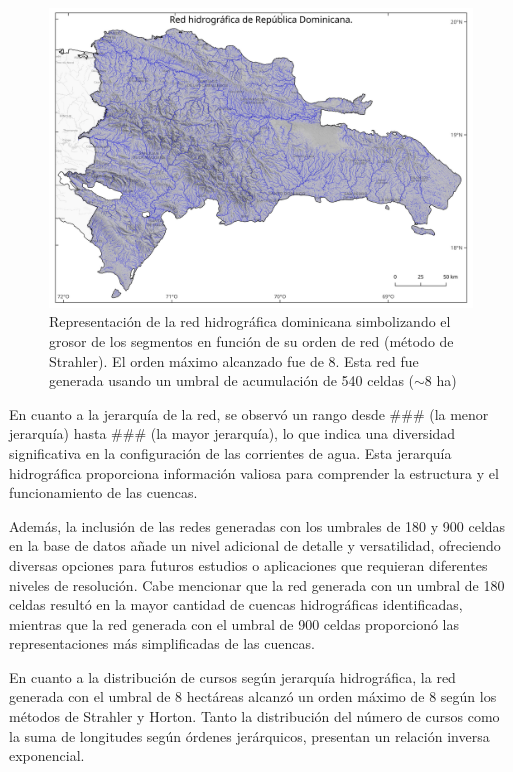 \documentclass[spanish]{article}
\begin{document}
\begin{figure}

{\centering \includegraphics[width=1\linewidth]{figuras/red-orden-nacional} 

}

\caption{Representación de la red hidrográfica dominicana simbolizando el grosor de los segmentos en función de su orden de red (método de Strahler). El orden máximo alcanzado fue de 8. Esta red fue generada usando un umbral de acumulación de 540 celdas ($\sim$8 ha)}\label{fig:redordennacional}
\end{figure}

En cuanto a la jerarquía de la red, se observó un rango desde \#\#\# (la
menor jerarquía) hasta \#\#\# (la mayor jerarquía), lo que indica una
diversidad significativa en la configuración de las corrientes de agua.
Esta jerarquía hidrográfica proporciona información valiosa para
comprender la estructura y el funcionamiento de las cuencas.

Además, la inclusión de las redes generadas con los umbrales de 180 y
900 celdas en la base de datos añade un nivel adicional de detalle y
versatilidad, ofreciendo diversas opciones para futuros estudios o
aplicaciones que requieran diferentes niveles de resolución. Cabe
mencionar que la red generada con un umbral de 180 celdas resultó en la
mayor cantidad de cuencas hidrográficas identificadas, mientras que la
red generada con el umbral de 900 celdas proporcionó las
representaciones más simplificadas de las cuencas.

En cuanto a la distribución de cursos según jerarquía hidrográfica, la
red generada con el umbral de 8 hectáreas alcanzó un orden máximo de 8
según los métodos de Strahler y Horton. Tanto la distribución del número
de cursos como la suma de longitudes según órdenes jerárquicos,
presentan un relación inversa exponencial.
\end{document}
